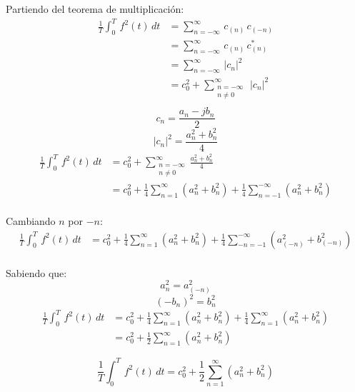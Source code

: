 Partiendo del teorema de multiplicación:
\begin{equation*}
\begin{split}
    \frac{1}{T}\int_0^T\,f^2(t)\,dt
        &=\sum_{n={-\infty}}^\infty\,c_{(n)}\,c_{(-n)}\\
        &=\sum_{n={-\infty}}^\infty\,c_{(n)}\,c_{(n)}^*\\
        &=\sum_{n={-\infty}}^\infty\,{|c_n|}^2\\
        &=c_0^2+\sum_{\substack{n=-\infty\\n\neq0}}^\infty\,{|c_n|}^2\\
\end{split}
\end{equation*}
\begin{equation*}
    c_n=\frac{a_n-jb_n}{2}
\end{equation*}
\begin{equation*}
    {|c_n|}^2=\frac{a_n^2+b_n^2}{4}
\end{equation*}
\begin{equation*}
\begin{split}
    \frac{1}{T}\int_0^T\,f^2(t)\,dt
        &=c_0^2+\sum_{\substack{n=-\infty\\n\neq0}}^\infty
            \frac{a_n^2+b_n^2}{4}\\
        &=c_0^2+\frac{1}{4}\sum_{n=1}^\infty(a_n^2+b_n^2)
            +\frac{1}{4}\sum_{n=-1}^{-\infty}(a_n^2+b_n^2)\\
\end{split}
\end{equation*}

Cambiando $n$ por $-n$:
\begin{equation*}
\begin{split}
    \frac{1}{T}\int_0^T\,f^2(t)\,dt
        &=c_0^2+\frac{1}{4}\sum_{n=1}^\infty(a_n^2+b_n^2)
            +\frac{1}{4}\sum_{-n=-1}^{-\infty}(a_{(-n)}^2+b_{(-n)}^2)\\
\end{split}
\end{equation*}

Sabiendo que:
\begin{equation*}
    a_n^2=a_{(-n)}^2
\end{equation*}
\begin{equation*}
    {(-b_n)}^2=b_n^2
\end{equation*}
\begin{equation*}
\begin{split}
    \frac{1}{T}\int_0^T\,f^2(t)\,dt
        &=c_0^2+\frac{1}{4}\sum_{n=1}^\infty(a_n^2+b_n^2)
            +\frac{1}{4}\sum_{n=1}^\infty(a_n^2+b_n^2)\\
        &=c_0^2+\frac{1}{2}\sum_{n=1}^\infty(a_n^2+b_n^2)
\end{split}
\end{equation*}

\begin{equation}
    \frac{1}{T}\int_0^T\,f^2(t)\,dt
        =c_0^2+\frac{1}{2}\sum_{n=1}^\infty(a_n^2+b_n^2)
\end{equation}

